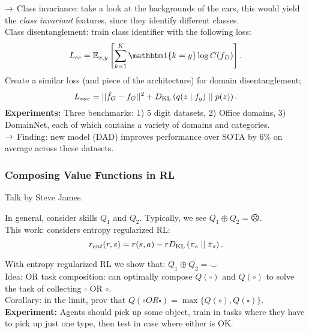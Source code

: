 $\rightarrow$ Class invariance: take a look at the backgrounds of the cars, this would yield the {\it class invariant} features, since they identify different classes. \\

Class disentanglement: train class identifier with the following loss:
\[
L_{ce} = \bE_{x,y} \left[\sum_{k=1}^K \indic\{k=y\} \log C(f_D)\right].
\]
Create a similar loss (and piece of the architecture) for domain disentanglement;
\[
L_{vae} = ||\hat{f}_G - f_G||^2 + D_{\text{KL}}\left(q(z \mid f_g) \mid \mid p(z)\right).
\]
{\bf Experiments:} Three benchmarks: 1) 5 digit datasets, 2) Office domains, 3) DomainNet, each of which contains a variety of domains and categories. \\

$\rightarrow$ Finding: new model (DAD) improves performance over SOTA by 6\% on average across these datasets.

\spacerule


\subsubsection{Composing Value Functions in RL~\cite{van2019composing}}

Talk by Steve James. \\


In general, consider skills $Q_1$ and $Q_2$. Typically, we see $Q_1 \oplus Q_2 = \frownie$. \\

This work: considers entropy regularized RL:
\[
r_{ent}(r,s) = r(s,a) - r D_{\text{KL}}\left(\pi_s \mid \mid \bar{\pi}_s\right).
\]


With entropy regularized RL we show that: $Q_1 \oplus Q_2 = \smile$ \\

Idea: OR task composition: can optimally compose $Q(\square)$ and $Q(\circ)$ to solve the task of collecting $\square$ OR $\circ$. \\

Corollary: in the limit, prov that $Q(\circ OR \square) = \max\{Q(\circ), Q(\square)\}$. \\

{\bf Experiment:} Agents should pick up some object, train in tasks where they have to pick up just one type, then test in case where either is OK. \\

